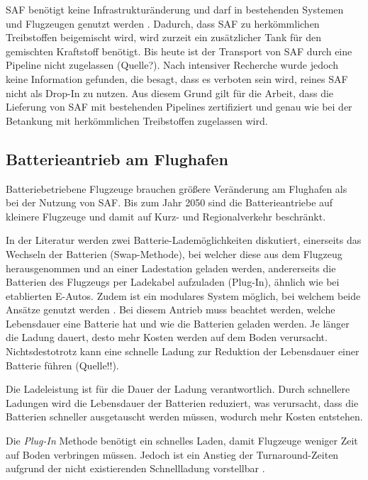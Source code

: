 SAF benötigt keine Infrastrukturänderung und darf in bestehenden Systemen 
und Flugzeugen genutzt werden \cite{dalmia2022powering}.
Dadurch, dass SAF zu herkömmlichen Treibstoffen beigemischt wird, 
wird zurzeit ein zusätzlicher Tank für den gemischten Kraftstoff benötigt. 
Bis heute ist der Transport von SAF durch eine Pipeline nicht zugelassen (Quelle?). %
Nach intensiver Recherche wurde jedoch keine Information gefunden, 
die besagt, dass es verboten sein wird, reines SAF nicht als Drop-In zu nutzen.
Aus diesem Grund gilt für die Arbeit, dass die Lieferung von SAF mit bestehenden Pipelines 
zertifiziert und genau wie bei der Betankung mit herkömmlichen Treibstoffen zugelassen wird.

\subsection{Batterieantrieb am Flughafen}
Batteriebetriebene Flugzeuge brauchen größere Veränderung am 
Flughafen als bei der Nutzung von SAF.
Bis zum Jahr 2050 sind die Batterieantriebe auf kleinere Flugzeuge 
und damit auf Kurz- und Regionalverkehr beschränkt. 

In der Literatur werden zwei Batterie-Lademöglichkeiten diskutiert, 
einerseits das Wechseln der Batterien (Swap-Methode), 
bei welcher diese aus dem Flugzeug herausgenommen und an einer Ladestation geladen werden, 
andererseits die Batterien des Flugzeugs per Ladekabel aufzuladen (Plug-In), 
ähnlich wie bei etablierten E-Autos.
Zudem ist ein modulares System möglich, bei welchem beide Ansätze genutzt werden \cite{salucci2020optimal}.
%
Bei diesem Antrieb muss beachtet werden, 
welche Lebensdauer eine Batterie hat und wie die Batterien geladen werden. 
Je länger die Ladung dauert, desto mehr Kosten werden auf dem Boden verursacht. 
Nichtsdestotrotz kann eine schnelle Ladung zur Reduktion der Lebensdauer einer Batterie führen (Quelle!!).

Die Ladeleistung ist für die Dauer der Ladung verantwortlich. 
Durch schnellere Ladungen wird die Lebensdauer der Batterien reduziert,
was verursacht, dass die Batterien schneller ausgetauscht werden 
müssen, wodurch mehr Kosten entstehen.

%
Die \textit{Plug-In} Methode benötigt ein schnelles Laden, 
damit Flugzeuge weniger Zeit auf Boden verbringen müssen.
Jedoch ist ein Anstieg der Turnaround-Zeiten aufgrund der 
nicht existierenden Schnellladung vorstellbar \cite{avogadro2024demystifying}. %

